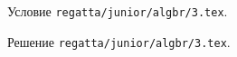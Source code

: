 Условие \texttt{regatta/junior/algbr/3.tex}.

\solution Решение \texttt{regatta/junior/algbr/3.tex}.
